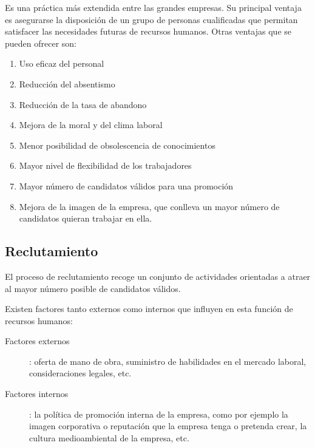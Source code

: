 \documentclass[10pt,a4paper,spanish]{report}
\begin{document}
                        Es una práctica más extendida entre las grandes empresas. Su principal ventaja es asegurarse la disposición de un grupo de personas cualificadas que permitan satisfacer las necesidades futuras de recursos humanos. Otras ventajas que se pueden ofrecer son:
                        \begin{enumerate}
                              \item Uso eficaz del personal
                              \item Reducción del absentismo
                              \item Reducción de la tasa de abandono
                              \item Mejora de la moral y del clima laboral
                              \item Menor posibilidad de obsolescencia de conocimientos
                              \item Mayor nivel de flexibilidad de los trabajadores
                              \item Mayor número de candidatos válidos para una promoción
                              \item Mejora de la imagen de la empresa, que conlleva un mayor número de candidatos quieran trabajar en ella.
                        \end{enumerate}
	     
           \subsection{\textcolor[rgb]{0.8,0.2,0.8}Reclutamiento}

                  El proceso de reclutamiento recoge un conjunto de actividades orientadas a atraer al mayor número posible de candidatos válidos.

                  Existen factores tanto externos como internos que influyen en esta función de recursos humanos:
                  \begin{description}
                        \item[Factores externos]: oferta de mano de obra, suministro de habilidades en el mercado laboral, consideraciones legales, etc.
                        \item[Factores internos]: la política de promoción interna de la empresa, como por ejemplo la imagen corporativa o reputación que la empresa tenga o pretenda crear, la cultura medioambiental de la empresa, etc.
                  \end{description}
\end{document}
